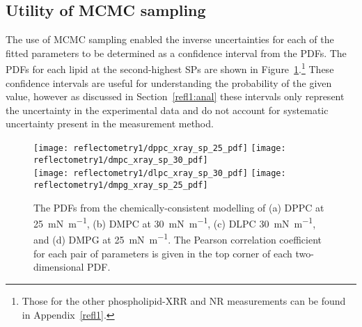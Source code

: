 \subsection{Utility of MCMC sampling}
The use of MCMC sampling enabled the inverse uncertainties for each of the fitted parameters to be determined as a confidence interval from the PDFs.
The PDFs for each lipid at the second-highest SPs are shown in Figure~\ref{fig:pdfs3}.\footnote{Those for the other phospholipid-XRR and NR measurements can be found in Appendix~\ref{refl1}.}
These confidence intervals are useful for understanding the probability of the given value, however as discussed in Section~\ref{refl1:anal} these intervals only represent the uncertainty in the experimental data and do not account for systematic uncertainty present in the measurement method.
%
\begin{figure}[t]
    \centering
    \texttt{[image: reflectometry1/dppc\_xray\_sp\_25\_pdf]}
    \texttt{[image: reflectometry1/dmpc\_xray\_sp\_30\_pdf]} \\
    \texttt{[image: reflectometry1/dlpc\_xray\_sp\_30\_pdf]}
    \texttt{[image: reflectometry1/dmpg\_xray\_sp\_25\_pdf]}
    \caption{The PDFs from the chemically-consistent modelling of (a) DPPC at \SI{25}{\milli\newton\per\meter}, (b) DMPC at \SI{30}{\milli\newton\per\meter}, (c) DLPC \SI{30}{\milli\newton\per\meter}, and (d) DMPG at \SI{25}{\milli\newton\per\meter}. The Pearson correlation coefficient for each pair of parameters is given in the top corner of each two-dimensional PDF.}
    \label{fig:pdfs3}
\end{figure}
%

